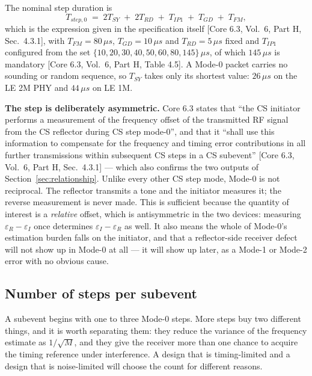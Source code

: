 \documentclass[11pt,a4paper]{article}
\newcommand{\us}{\,\ensuremath{\upmu}s}
\newcommand{\Tsy}{T_{SY}}
\newcommand{\Tgd}{T_{GD}}
\newcommand{\Tfm}{T_{FM}}
\newcommand{\Trd}{T_{RD}}
\newcommand{\Tipone}{T_{IP1}}
\providecommand{\upmu}{\mu}
\newcommand{\core}[1]{\textcolor{rulegrey}{\small[Core 6.3, #1]}}
\begin{document}
The nominal step duration is
\begin{equation}
T_{step,0} \;=\; 2\Tsy \;+\; 2\Trd \;+\; \Tipone \;+\; \Tgd \;+\; \Tfm ,
\label{eq:stepdur}
\end{equation}
which is the expression given in the specification itself
\core{Vol.\ 6, Part H, Sec.\ 4.3.1}, with $\Tfm = 80\us$, $\Tgd = 10\us$ and $\Trd = 5\us$ fixed and
$\Tipone$ configured from the set $\{10,20,30,40,50,60,80,145\}\us$, of which $145\us$ is mandatory
\core{Vol.\ 6, Part H, Table 4.5}. A Mode-0 packet carries no
sounding or random sequence, so $\Tsy$ takes only its shortest value: $26\us$ on the LE 2M PHY and
$44\us$ on LE 1M.

\begin{callout}
\textbf{The step is deliberately asymmetric.} Core 6.3 states that ``the CS initiator performs a
measurement of the frequency offset of the transmitted RF signal from the CS reflector during CS step
mode-0'', and that it ``shall use this information to compensate for the frequency and timing error
contributions in all further transmissions within subsequent CS steps in a CS subevent''
\core{Vol.\ 6, Part H, Sec.\ 4.3.1} --- which also confirms the two outputs of
Section~\ref{sec:relationship}. Unlike every other CS step mode, Mode-0 is not reciprocal. The reflector transmits a tone and the initiator measures it; the reverse measurement is
never made. This is sufficient because the quantity of interest is a \emph{relative} offset, which is
antisymmetric in the two devices: measuring $\varepsilon_R-\varepsilon_I$ once determines
$\varepsilon_I-\varepsilon_R$ as well. It also means the whole of Mode-0's estimation burden falls on
the initiator, and that a reflector-side receiver defect will not show up in Mode-0 at all --- it will
show up later, as a Mode-1 or Mode-2 error with no obvious cause.
\end{callout}

\subsection{Number of steps per subevent}

A subevent begins with one to three Mode-0 steps. More steps buy two different things, and it is
worth separating them: they reduce the variance of the frequency estimate as $1/\sqrt{M}$, and they
give the receiver more than one chance to acquire the timing reference under interference. A design
that is timing-limited and a design that is noise-limited will choose the count for different
reasons.
\end{document}
